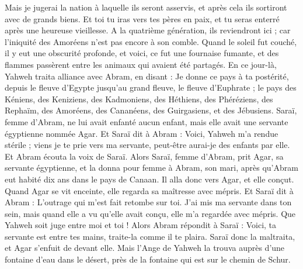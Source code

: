 \begin{multicols}{2}
Mais je jugerai la nation à laquelle ils seront asservis, et après cela ils sortiront avec de grands biens.
Et toi tu iras vers tes pères en paix, et tu seras enterré après une heureuse vieillesse.
A la quatrième génération, ils reviendront ici ; car l'iniquité des Amoréens n'est pas encore à son comble.
Quand le soleil fut couché, il y eut une obscurité profonde, et voici, ce fut une fournaise fumante, et des flammes passèrent entre les animaux qui avaient été partagés.
En ce jour-là, Yahweh traita alliance avec Abram, en disant : Je donne ce pays à ta postérité, depuis le fleuve d'Egypte jusqu'au grand fleuve, le fleuve d'Euphrate ;
le pays des Kéniens, des Keniziens, des Kadmoniens,
des Héthiens, des Phéréziens, des Rephaïm,
des Amoréens, des Cananéens, des Guirgasiens, et des Jébusiens.
\VerseOne{}Saraï, femme d'Abram, ne lui avait enfanté aucun enfant, mais elle avait une servante égyptienne nommée Agar.
Et Saraï dit à Abram : Voici, Yahweh m'a rendue stérile ; viens je te prie vers ma servante, peut-être aurai-je des enfants par elle. Et Abram écouta la voix de Saraï.
Alors Saraï, femme d'Abram, prit Agar, sa servante égyptienne, et la donna pour femme à Abram, son mari, après qu’Abram eut habité dix ans dans le pays de Canaan.
Il alla donc vers Agar, et elle conçut. Quand Agar se vit enceinte, elle regarda sa maîtresse avec mépris.
Et Saraï dit à Abram : L'outrage qui m'est fait retombe sur toi. J’ai mis ma servante dans ton sein, mais quand elle a vu qu'elle avait conçu, elle m'a regardée avec mépris. Que Yahweh soit juge entre moi et toi !
Alors Abram répondit à Saraï : Voici, ta servante est entre tes mains, traite-la comme il te plaira. Saraï donc la maltraita, et Agar s'enfuit de devant elle.
Mais l'Ange de Yahweh la trouva auprès d'une fontaine d'eau dans le désert, près de la fontaine qui est sur le chemin de Schur.

\end{multicols}
